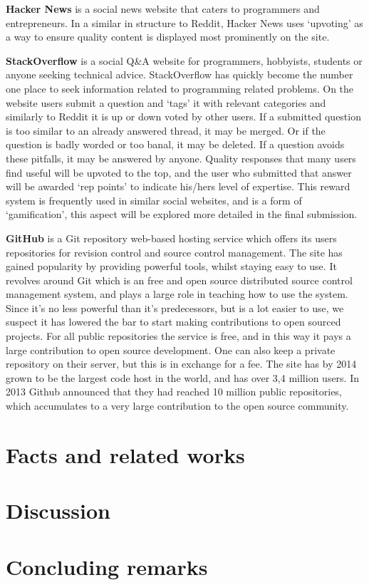 \documentclass[a4paper,11pt]{article} %
\begin{document}
\textbf{Hacker News} is a social news website that caters to programmers and
entrepreneurs. In a similar in structure to Reddit, Hacker News uses
‘upvoting’ as a way to ensure quality content is displayed most prominently
on the site.


\textbf{StackOverflow} is a social Q\&A website for programmers, hobbyists,
students or anyone seeking technical advice. StackOverflow has quickly
become the number one place to seek information related to programming
related problems. On the website users submit a question and ‘tags’ it with
relevant categories and similarly to Reddit it is up or down voted by other
users. If a submitted question is too similar to an already answered thread,
it may be merged. Or if the question is badly worded or too banal, it may be
deleted. If a question avoids these pitfalls, it may be answered by
anyone. Quality responses that many users find useful will be upvoted to the
top, and the user who submitted that answer will be awarded ‘rep points’ to
indicate his/hers level of expertise. This reward system is frequently used
in similar social websites, and is a form of ‘gamification’, this aspect
will be explored more detailed in the final submission.


\textbf{GitHub} is a Git repository web-based hosting service which offers
its users repositories for revision control and source control
management. The site has gained popularity by providing powerful tools,
whilst staying easy to use. It revolves around Git which is an free and open
source distributed source control management system, and plays a large role
in teaching how to use the system. Since it’s no less powerful than it’s
predecessors, but is a lot easier to use, we suspect it has lowered the bar
to start making contributions to open sourced projects. For all public
repositories the service is free, and in this way it pays a large
contribution to open source development. One can also keep a private
repository on their server, but this is in exchange for a fee. The site has
by 2014 grown to be the largest code host in the world, and has over 3,4
million users. In 2013 Github announced that they had reached 10 million
public repositories, which accumulates to a very large contribution to the
open source community.

\section{Facts and related works}

\section{Discussion}

\section{Concluding remarks}

\printbibliography
 
\end{document}

